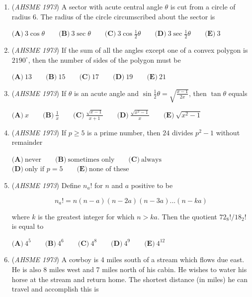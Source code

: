 \begin{enumerate}
  $\textbf{(A)}\ 1.1\qquad\textbf{(B)}\ 1.15\qquad\textbf{(C)}\ 1.2\qquad\textbf{(D)}\ 1.25\qquad\textbf{(E)}\ 1.75$


	\item (\textit{AHSME 1973}) A sector with acute central angle $\theta$ is cut from a circle of radius 6. The radius of the circle circumscribed about the sector is 


 $\textbf{(A)}\ 3\cos\theta \qquad \textbf{(B)}\ 3\sec\theta \qquad \textbf{(C)}\ 3 \cos \frac12 \theta \qquad \textbf{(D)}\ 3 \sec \frac12 \theta \qquad \textbf{(E)}\ 3$


	\item (\textit{AHSME 1973}) If the sum of all the angles except one of a convex polygon is $2190^{\circ}$, then the number of sides of the polygon must be 


 $\textbf{(A)}\ 13 \qquad \textbf{(B)}\ 15 \qquad \textbf{(C)}\ 17 \qquad \textbf{(D)}\ 19 \qquad \textbf{(E)}\ 21$


	\item (\textit{AHSME 1973}) If $\theta$ is an acute angle and $\sin \frac12 \theta = \sqrt{\frac{x-1}{2x}}$, then $\tan \theta$ equals 


 $\textbf{(A)}\ x \qquad \textbf{(B)}\ \frac1{x} \qquad \textbf{(C)}\ \frac{\sqrt{x-1}}{x+1} \qquad \textbf{(D)}\ \frac{\sqrt{x^2-1}}{x} \qquad \textbf{(E)}\ \sqrt{x^2-1}$


	\item (\textit{AHSME 1973}) If $p \geq 5$ is a prime number, then $24$ divides $p^2 - 1$ without remainder 


 $\textbf{(A)}\ \text{never} \qquad \textbf{(B)}\ \text{sometimes only} \qquad \textbf{(C)}\ \text{always} \qquad$
$\textbf{(D)}\ \text{only if } p =5 \qquad \textbf{(E)}\ \text{none of these}$


	\item (\textit{AHSME 1973}) Define $n_a!$ for $n$ and $a$ positive to be 


 
 \[n_a ! = n (n-a)(n-2a)(n-3a)...(n-ka)\]


 where $k$ is the greatest integer for which $n>ka$. Then the quotient $72_8!/18_2!$ is equal to 


 $\textbf{(A)}\ 4^5 \qquad \textbf{(B)}\ 4^6 \qquad \textbf{(C)}\ 4^8 \qquad \textbf{(D)}\ 4^9 \qquad \textbf{(E)}\ 4^{12}$


	\item (\textit{AHSME 1973}) A cowboy is 4 miles south of a stream which flows due east. He is also 8 miles west and 7 miles north of his cabin. He wishes to water his horse at the stream and return home. The shortest distance (in miles) he can travel and accomplish this is 



\end{enumerate}
